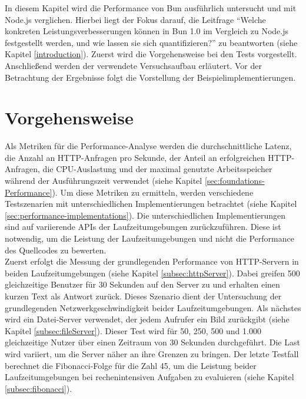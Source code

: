  \label{ch:performanceAnalysis}
In diesem Kapitel wird die Performance von Bun ausführlich untersucht und mit Node.js verglichen. Hierbei liegt der Fokus darauf, die Leitfrage ``Welche konkreten Leistungsverbesserungen können in Bun 1.0 im Vergleich zu Node.js festgestellt werden, und wie lassen sie sich quantifizieren?'' zu beantworten (siehe Kapitel \ref{introduction}). Zuerst wird die Vorgehensweise bei den Tests vorgestellt. Anschließend werden der verwendete Versuchsaufbau erläutert. Vor der Betrachtung der Ergebnisse folgt die Vorstellung der Beispielimplementierungen.


\section{Vorgehensweise} \label{sec:performance-approach}
Als Metriken für die Performance-Analyse werden die durchschnittliche Latenz, die Anzahl an HTTP-Anfragen pro Sekunde, der Anteil an erfolgreichen HTTP-Anfragen, die CPU-Auslastung und der maximal genutzte Arbeitsspeicher während der Ausführungszeit verwendet (siehe Kapitel \ref{sec:foundations-Performance}). Um diese Metriken zu ermitteln, werden verschiedene Testszenarien mit unterschiedlichen Implementierungen betrachtet (siehe Kapitel \ref{sec:performance-implementations}). Die unterschiedlichen Implementierungen sind auf variierende APIs  der Laufzeitumgebungen zurückzuführen. Diese ist notwendig, um die Leistung der Laufzeitumgebungen und nicht die Performance des Quellcodes zu bewerten.\\

\noindent
Zuerst erfolgt die Messung der grundlegenden Performance von HTTP-Servern in beiden Laufzeitumgebungen (siehe Kapitel \ref{subsec:httpServer}). Dabei greifen 500 gleichzeitige Benutzer für 30 Sekunden auf den Server zu und erhalten einen kurzen Text als Antwort zurück. Dieses Szenario dient der Untersuchung der grundlegenden Netzwerkgeschwindigkeit beider Laufzeitumgebungen. Als nächstes wird ein Datei-Server verwendet, der jedem Aufrufer ein Bild zurückgibt (siehe Kapitel \ref{subsec:fileServer}). Dieser Test wird für 50, 250, 500 und 1.000 gleichzeitige Nutzer über einen Zeitraum von 30 Sekunden durchgeführt. Die Last wird variiert, um die Server näher an ihre Grenzen zu bringen. Der letzte Testfall berechnet die Fibonacci-Folge für die Zahl 45, um die Leistung beider Laufzeitumgebungen bei rechenintensiven Aufgaben zu evaluieren (siehe Kapitel \ref{subsec:fibonacci}).

